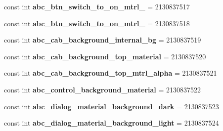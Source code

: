 \begin{DoxyCompactItemize}
const int {\bfseries abc\+\_\+btn\+\_\+switch\+\_\+to\+\_\+on\+\_\+mtrl\+\_} = 2130837517
\item 
\mbox{\label{class_sample_app_1_1_droid_1_1_resource_1_1_drawable_a920aa9b475cca6cc172739504388782f}} 
const int {\bfseries abc\+\_\+btn\+\_\+switch\+\_\+to\+\_\+on\+\_\+mtrl\+\_} = 2130837518
\item 
\mbox{\label{class_sample_app_1_1_droid_1_1_resource_1_1_drawable_afa4f4caf2a4a24bb6f6c34d4d86cb378}} 
const int {\bfseries abc\+\_\+cab\+\_\+background\+\_\+internal\+\_\+bg} = 2130837519
\item 
\mbox{\label{class_sample_app_1_1_droid_1_1_resource_1_1_drawable_a8b53fc7bae54f13c4bf1e961ed51e4e1}} 
const int {\bfseries abc\+\_\+cab\+\_\+background\+\_\+top\+\_\+material} = 2130837520
\item 
\mbox{\label{class_sample_app_1_1_droid_1_1_resource_1_1_drawable_aae0f5e672ab114431205b35f7f3d4fcd}} 
const int {\bfseries abc\+\_\+cab\+\_\+background\+\_\+top\+\_\+mtrl\+\_\+alpha} = 2130837521
\item 
\mbox{\label{class_sample_app_1_1_droid_1_1_resource_1_1_drawable_a37b0b4b27f451aa0af499c5c11323f29}} 
const int {\bfseries abc\+\_\+control\+\_\+background\+\_\+material} = 2130837522
\item 
\mbox{\label{class_sample_app_1_1_droid_1_1_resource_1_1_drawable_a3278cdd5ab359fe4b6161b3d3225d536}} 
const int {\bfseries abc\+\_\+dialog\+\_\+material\+\_\+background\+\_\+dark} = 2130837523
\item 
\mbox{\label{class_sample_app_1_1_droid_1_1_resource_1_1_drawable_afb67be78c3509124937d2d01ee36322b}} 
const int {\bfseries abc\+\_\+dialog\+\_\+material\+\_\+background\+\_\+light} = 2130837524
\item 
\mbox{\label{class_sample_app_1_1_droid_1_1_resource_1_1_drawable_a022d481f294c04f7b0e388c815d9abbe}} 

\end{DoxyCompactItemize}
